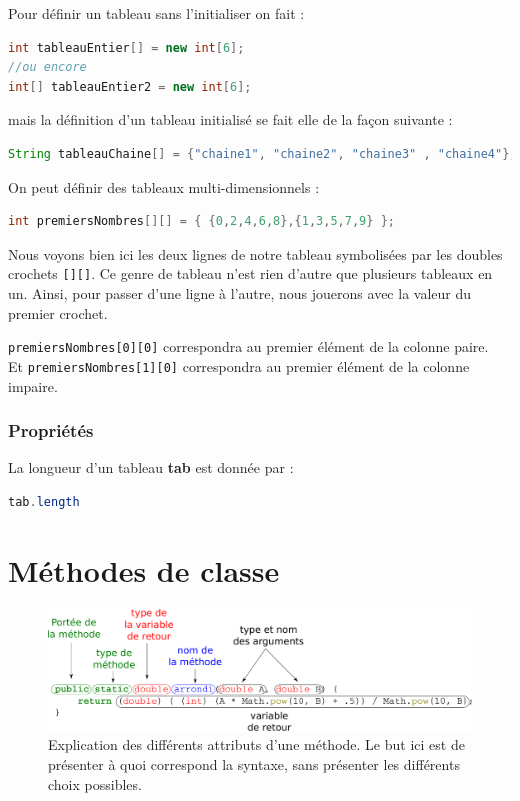 \documentclass[a4paper,twoside]{article}
\begin{document}
Pour définir un tableau sans l'initialiser on fait :
\begin{lstlisting}[language=java]
int tableauEntier[] = new int[6];
//ou encore
int[] tableauEntier2 = new int[6];
\end{lstlisting}
mais la définition d'un tableau initialisé se fait elle de la façon suivante :
\begin{lstlisting}[language=java]
String tableauChaine[] = {"chaine1", "chaine2", "chaine3" , "chaine4"};
\end{lstlisting}

\bigskip

On peut définir des tableaux multi-dimensionnels : 
\begin{lstlisting}[language=java]
int premiersNombres[][] = { {0,2,4,6,8},{1,3,5,7,9} };
\end{lstlisting}

Nous voyons bien ici les deux lignes de notre tableau symbolisées par les doubles crochets \texttt{[][]}. Ce genre de tableau n'est rien d'autre que plusieurs tableaux en un. Ainsi, pour passer d'une ligne à l'autre, nous jouerons avec la valeur du premier crochet.
\begin{exemple}
\verb|premiersNombres[0][0]| correspondra au premier élément de la colonne paire.\\
Et \verb|premiersNombres[1][0]| correspondra au premier élément de la colonne impaire.
\end{exemple}

\subsubsection{Propriétés}
La longueur d'un tableau \textbf{tab} est donnée par :
\begin{lstlisting}[language=java]
tab.length
\end{lstlisting}

\section{Méthodes de classe}

\begin{figure}[htb]
\centering
\includegraphics[width=\linewidth]{figures/method_scheme.pdf}
\caption{Explication des différents attributs d'une méthode. Le but ici est de présenter à quoi correspond la syntaxe, sans présenter les différents choix possibles.}
\end{figure}
\end{document}
